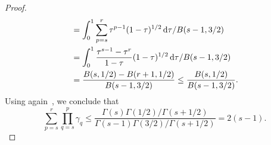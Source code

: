\documentclass[../main]{subfiles}
\begin{document}
\begin{proof}
\begin{equation}
\begin{split}
        &= \int_{0}^{1} \sum_{p = s}^{r} \tau^{p - 1} (1 - \tau)^{1 / 2} \odif{\tau} / B(s - 1, 3 / 2) \\
        &= \int_{0}^{1} \frac{\tau^{s - 1} - \tau^r}{1 - \tau} (1 - \tau)^{1 / 2} \odif{\tau} / B(s - 1, 3 / 2) \\
        &= \frac{B(s, 1 / 2) - B(r + 1, 1 / 2)}{B(s - 1, 3 / 2)} 
        \le \frac{B(s, 1 / 2)}{B(s - 1, 3 / 2)}
        .\end{split}
    \end{equation} 
    Using again~, we conclude that
    \begin{equation}
        \sum_{p = s}^{r} \prod_{q = s}^{p} \gamma_q
        \le \frac{\Gamma(s) \Gamma(1 / 2) / \Gamma(s + 1 / 2)}{\Gamma(s - 1) \Gamma(3 / 2) / \Gamma(s + 1 / 2)}
        = 2 (s - 1)
    .\end{equation} 
\end{proof}
\end{document}
